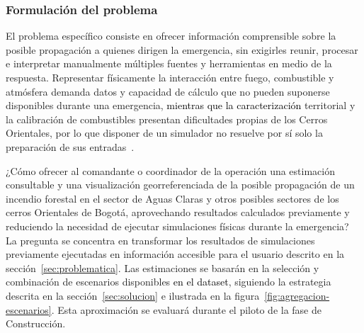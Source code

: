 \subsubsection{Formulación del problema}\label{sec:problema}
El problema específico consiste en ofrecer información comprensible sobre la posible propagación a quienes dirigen la emergencia, sin exigirles reunir, procesar e interpretar manualmente múltiples fuentes y herramientas en medio de la respuesta. Representar físicamente la interacción entre fuego, combustible y atmósfera demanda datos y capacidad de cálculo que no pueden suponerse disponibles durante una emergencia, \textcolor{black}{mientras que la caracterización} territorial y la calibración de combustibles presentan dificultades propias de los Cerros Orientales, por lo que disponer de un simulador no resuelve por sí solo la preparación de sus entradas~\cite{verano2013,mendez2018}.


¿Cómo ofrecer al comandante o coordinador de la operación una estimación consultable y una visualización georreferenciada de la posible propagación de un incendio forestal en el sector de Aguas Claras y otros posibles sectores de los cerros Orientales de Bogotá, aprovechando resultados calculados previamente y reduciendo la necesidad de ejecutar simulaciones físicas durante la emergencia? La pregunta se concentra en transformar los resultados de simulaciones previamente ejecutadas en información accesible para el usuario descrito en la sección~\ref{sec:problematica}. Las estimaciones se basarán en la selección y combinación de escenarios disponibles \textcolor{black}{en el dataset}, siguiendo la estrategia descrita en la sección~\ref{sec:solucion} e ilustrada en la figura~\ref{fig:agregacion-escenarios}. Esta aproximación se evaluará durante el piloto de la fase de Construcción.
